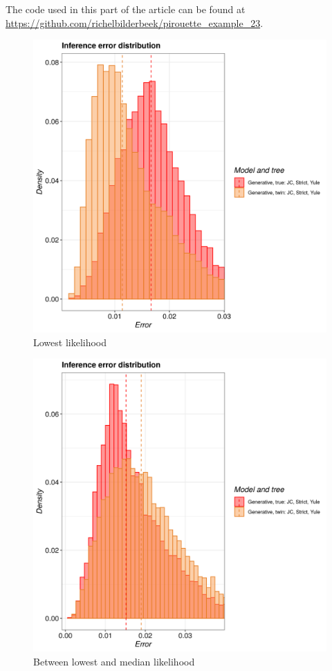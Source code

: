 The code used in this part of the article can be found at 
\url{https://github.com/richelbilderbeek/pirouette_example_23}.

\begin{figure}[H]
  \includegraphics[width=\textwidth]{pirouette_example_23/example_23_314/errors.png}
  \caption{Lowest likelihood}
\end{figure}

\begin{figure}[H]
  \includegraphics[width=\textwidth]{pirouette_example_23/example_23_315/errors.png}
  \caption{Between lowest and median likelihood}
\end{figure}

